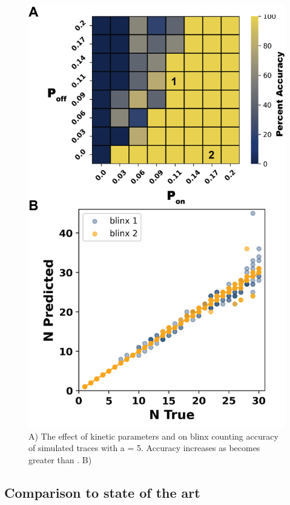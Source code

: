 \begin{figure}[ht]
  \includegraphics[width=\linewidth]{figures/kinetic_regime}
  \caption{A) The effect of kinetic parameters \pon and \poff on blinx counting accuracy of simulated traces with a \turen = 5. Accuracy increases as \pon becomes greater than \poff. B) }
  \label{fig:results:regime}
\end{figure}

\subsection{Comparison to state of the art \lbfcs}

